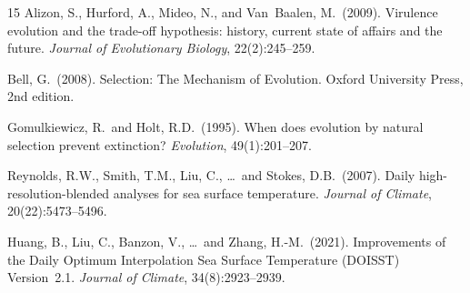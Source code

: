 \documentclass[11pt]{article}
\begin{document}
\begin{thebibliography}{15}
Alizon, S., Hurford, A., Mideo, N., and Van~Baalen, M.\ (2009).
\newblock Virulence evolution and the trade-off hypothesis: history, current state of affairs and the future.
\newblock \textit{Journal of Evolutionary Biology}, 22(2):245--259.

Bell, G.\ (2008).
\newblock Selection: The Mechanism of Evolution.
\newblock Oxford University Press, 2nd edition.

Gomulkiewicz, R.\ and Holt, R.D.\ (1995).
\newblock When does evolution by natural selection prevent extinction?
\newblock \textit{Evolution}, 49(1):201--207.

Reynolds, R.W., Smith, T.M., Liu, C., \ldots\ and Stokes, D.B.\ (2007).
\newblock Daily high-resolution-blended analyses for sea surface temperature.
\newblock \textit{Journal of Climate}, 20(22):5473--5496.

Huang, B., Liu, C., Banzon, V., \ldots\ and Zhang, H.-M.\ (2021).
\newblock Improvements of the Daily Optimum Interpolation Sea Surface Temperature (DOISST) Version~2.1.
\newblock \textit{Journal of Climate}, 34(8):2923--2939.

\end{thebibliography}
\end{document}
